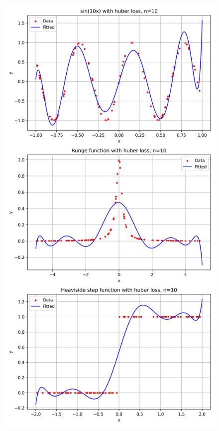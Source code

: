 \documentclass[a4paper,12pt]{article}
\begin{document}
\begin{figure}[b!]
    \centering
    
    \begin{minipage}{0.49\textwidth}
        \centering
        \includegraphics[width=\linewidth]{fig/compare_huber_loss (1).png}

\end{minipage}
\end{figure}
\end{document}
